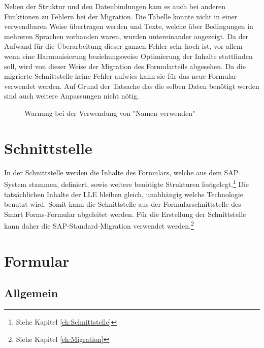 Neben der Struktur und den Datenbindungen kam es auch bei anderen Funktionen zu Fehlern bei der Migration. Die Tabelle konnte nicht in einer verwendbaren Weise übertragen werden und Texte, welche über Bedingungen in mehreren Sprachen vorhanden waren, wurden untereinander angezeigt. Da der Aufwand für die Überarbeitung dieser ganzen Fehler sehr hoch ist, vor allem wenn eine Harmonisierung beziehungsweise Optimierung der Inhalte stattfinden soll, wird von dieser Weise der Migration des Formularteils abgesehen. Da die migrierte Schnittstelle keine Fehler aufwies kann sie für das neue Formular verwendet werden. Auf Grund der Tatsache das die selben Daten benötigt werden sind auch weitere Anpassungen nicht nötig.
\begin{figure}[ht]
	\centering
	\caption{Warnung bei der Verwendung von "Namen verwenden"}
	\label{Namen-Fehler}
\end{figure}

\section{Schnittstelle}

In der Schnittstelle werden die Inhalte des Formulars, welche aus dem SAP System stammen, definiert, sowie weitere benötigte Strukturen festgelegt.\footnote{Siehe Kapitel \ref{ch:Schnittstelle}}
Die tatsächlichen Inhalte der \ac{LLE} bleiben gleich, unabhängig welche Technologie benutzt wird. Somit kann die Schnittstelle aus der Formularschnittstelle des Smart Forms-Formular abgeleitet werden. Für die Erstellung der Schnittstelle kann daher die SAP-Standard-Migration verwendet werden.\footnote{Siehe Kapitel \ref{ch:Migration}}


\section{Formular}

\subsection{Allgemein}

